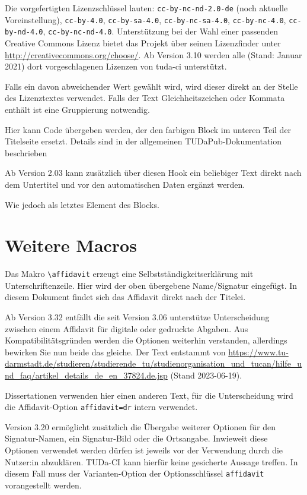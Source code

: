 \begin{description}
	Die vorgefertigten Lizenzschlüssel lauten: \verb+cc-by-nc-nd-2.0-de+ (noch aktuelle Voreinstellung), \verb+cc-by-4.0+, \verb+cc-by-sa-4.0+, \verb+cc-by-nc-sa-4.0+, \verb+cc-by-nc-4.0+, \verb+cc-by-nd-4.0+, \verb+cc-by-nc-nd-4.0+.
	Unterstützung bei der Wahl einer passenden Creative Commons Lizenz bietet das Projekt über seinen Lizenzfinder unter \url{http://creativecommons.org/choose/}.
	Ab Version 3.10 werden alle (Stand: Januar 2021) dort vorgeschlagenen Lizenzen von tuda-ci unterstützt.

	Falls ein davon abweichender Wert gewählt wird, wird dieser direkt an der Stelle des Lizenztextes verwendet. Falls der Text Gleichheitszeichen oder Kommata enthält ist eine Gruppierung notwendig.
	\item[titlegraphic] Hier kann Code übergeben werden, der den farbigen Block im unteren Teil der Titelseite ersetzt. Details sind in der allgemeinen TUDaPub-Dokumentation beschrieben \cite{tudapub}
	\item[titleintro] Ab Version 2.03 kann zusätzlich über diesen Hook ein beliebiger Text direkt nach dem Untertitel und vor den automatischen Daten ergänzt werden.
	\item[titleaddendum] Wie  jedoch als letztes Element des Blocks.
\end{description}

\section{Weitere Macros}
Das Makro \verb+\affidavit+ erzeugt eine Selbstständigkeitserklärung mit Unterschriftenzeile. Hier wird der oben übergebene Name/Signatur eingefügt.
In diesem Dokument findet sich das Affidavit direkt nach der Titelei.

Ab Version 3.32 entfällt die seit Version 3.06 unterstütze Unterscheidung zwischen einem Affidavit für digitale oder gedruckte Abgaben. Aus Kompatibilitätsgründen werden die Optionen weiterhin verstanden, allerdings bewirken Sie nun beide das gleiche. Der Text entstammt von  \url{https://www.tu-darmstadt.de/studieren/studierende_tu/studienorganisation_und_tucan/hilfe_und_faq/artikel_details_de_en_37824.de.jsp} (Stand 2023-06-19).

Dissertationen verwenden hier einen anderen Text, für die Unterscheidung wird die Affidavit-Option \verb+affidavit=dr+ intern verwendet.

Version 3.20 ermöglicht zusätzlich die Übergabe weiterer Optionen für den Signatur-Namen, ein Signatur-Bild oder die Ortsangabe.
Inwieweit diese Optionen verwendet werden dürfen ist jeweils vor der Verwendung durch die Nutzer:in abzuklären.
TUDa-CI kann hierfür keine gesicherte Aussage treffen.
In diesem Fall muss der Varianten-Option der Optionsschlüssel \verb+affidavit+ vorangestellt werden.

